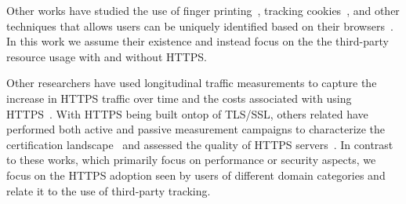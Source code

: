 \documentclass[letterpaper]{sig-alternate-10pt}
\begin{document}
Other works have studied the use of 
finger printing~\cite{NKJ+13,AJN+13},
tracking cookies~\cite{AEE+14}, 
and other techniques that allows users can be uniquely identified based on their browsers~\cite{Ecke09}.
In this work we assume their existence and instead focus on the
the third-party resource usage with and without HTTPS.


Other researchers have used longitudinal traffic measurements to capture the
increase in HTTPS traffic over time and the costs associated with using HTTPS~\cite{NFL+14}.
With HTTPS being built ontop of TLS/SSL, others related have performed both active and
passive measurement campaigns to characterize the certification landscape~\cite{DKBH13, HBKC11, AAVS13}
and assessed the quality of HTTPS servers~\cite{LEMD12, ClOo13}. In contrast to these works,
which primarily focus on performance or security aspects, we focus on the HTTPS adoption seen
by users of different domain categories and relate it to the use of third-party tracking.
\end{document}
